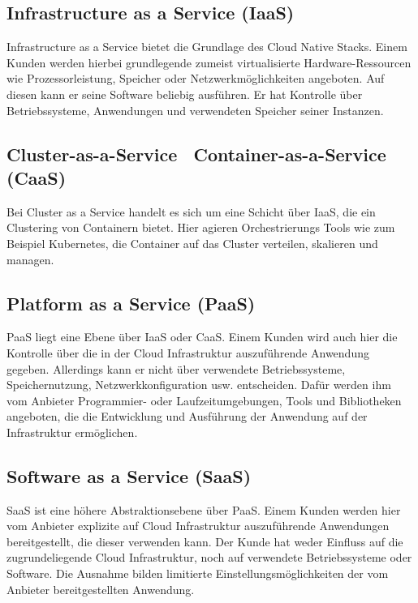 \subsection{Infrastructure as a Service (IaaS)}
Infrastructure as a Service bietet die Grundlage des Cloud Native Stacks. Einem Kunden werden hierbei grundlegende zumeist virtualisierte Hardware-Ressourcen wie Prozessorleistung, Speicher oder Netzwerkmöglichkeiten angeboten. Auf diesen kann er seine Software beliebig ausführen. Er hat Kontrolle über Betriebssysteme, Anwendungen und verwendeten Speicher seiner Instanzen\cite{mell_nist_2011}. \\

\subsection{Cluster-as-a-Service \ Container-as-a-Service (CaaS) }
Bei Cluster as a Service handelt es sich um eine Schicht über IaaS, die ein Clustering von Containern bietet. Hier agieren Orchestrierungs Tools wie zum Beispiel Kubernetes, die Container auf das Cluster verteilen, skalieren und managen\cite{kratzke_clouns_2016}. \\

\subsection{Platform as a Service (PaaS)}
PaaS liegt eine Ebene über IaaS oder CaaS. Einem Kunden wird auch hier die Kontrolle über die in der Cloud Infrastruktur auszuführende Anwendung gegeben. Allerdings kann er nicht über verwendete Betriebssysteme, Speichernutzung, Netzwerkkonfiguration usw. entscheiden. Dafür werden ihm vom Anbieter Programmier- oder Laufzeitumgebungen, Tools und Bibliotheken angeboten, die die Entwicklung und Ausführung der Anwendung auf der Infrastruktur ermöglichen\cite{mell_nist_2011}.\\

\subsection{Software as a Service (SaaS)}
SaaS ist eine höhere Abstraktionsebene über PaaS. Einem Kunden werden hier vom Anbieter explizite auf Cloud Infrastruktur auszuführende Anwendungen bereitgestellt, die dieser verwenden kann. Der Kunde hat weder Einfluss auf die zugrundeliegende Cloud Infrastruktur, noch auf verwendete Betriebssysteme oder Software. Die Ausnahme bilden limitierte Einstellungsmöglichkeiten der vom Anbieter bereitgestellten Anwendung\cite{mell_nist_2011}.

